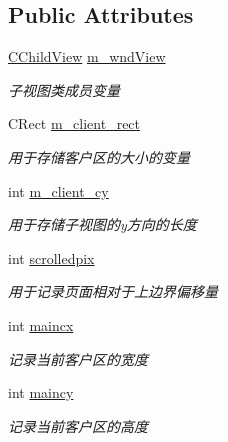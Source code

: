 \subsection*{Public Attributes}
\begin{DoxyCompactItemize}
\item 
\mbox{\label{class_c_main_frame_a7c3af9327c496f8c807d578f7a4ef4c5}} 
\hyperlink{class_c_child_view}{C\+Child\+View} \hyperlink{class_c_main_frame_a7c3af9327c496f8c807d578f7a4ef4c5}{m\+\_\+wnd\+View}
\begin{DoxyCompactList}\small\item\em 子视图类成员变量 \end{DoxyCompactList}\item 
\mbox{\label{class_c_main_frame_a0c53b2f10889123e0c4cf8912816aeaf}} 
C\+Rect \hyperlink{class_c_main_frame_a0c53b2f10889123e0c4cf8912816aeaf}{m\+\_\+client\+\_\+rect}
\begin{DoxyCompactList}\small\item\em 用于存储客户区的大小的变量 \end{DoxyCompactList}\item 
\mbox{\label{class_c_main_frame_ad561552de446751652ae4e98ded06589}} 
int \hyperlink{class_c_main_frame_ad561552de446751652ae4e98ded06589}{m\+\_\+client\+\_\+cy}
\begin{DoxyCompactList}\small\item\em 用于存储子视图的y方向的长度 \end{DoxyCompactList}\item 
\mbox{\label{class_c_main_frame_a342befca89935d78753d6a78514b83c5}} 
int \hyperlink{class_c_main_frame_a342befca89935d78753d6a78514b83c5}{scrolledpix}
\begin{DoxyCompactList}\small\item\em 用于记录页面相对于上边界偏移量 \end{DoxyCompactList}\item 
\mbox{\label{class_c_main_frame_a94f2543f4d46fdb15202c5386ef4ee0a}} 
int \hyperlink{class_c_main_frame_a94f2543f4d46fdb15202c5386ef4ee0a}{maincx}
\begin{DoxyCompactList}\small\item\em 记录当前客户区的宽度 \end{DoxyCompactList}\item 
\mbox{\label{class_c_main_frame_abfc6b521bf0730404603a66171e51159}} 
int \hyperlink{class_c_main_frame_abfc6b521bf0730404603a66171e51159}{maincy}
\begin{DoxyCompactList}\small\item\em 记录当前客户区的高度 \end{DoxyCompactList}\end{DoxyCompactItemize}
